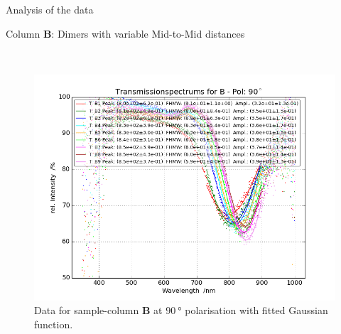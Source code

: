 \documentclass[pdftex, a4paper,11pt, twoside, UKenglish]{report}
\begin{document}
\begin{chapter}{Analysis of the data}
\begin{section}{Column \textbf{B}: Dimers with variable Mid-to-Mid
        distances}
\begin{figure}[ht!]
\begin{minipage}{.95\textwidth}
          \label{fig:TransspecFIT_BPol0}
        \end{minipage}\\
        \begin{minipage}{.95\textwidth}
          \centering
          \includegraphics[width=\textwidth]
              {Figures/TransspecFIT_BPol90.png}
          \caption{Data for sample-column \textbf{B} at $\SI{90}{\degree}$
              polarisation with fitted Gaussian function.}
          \label{fig:TransspecFIT_BPol90}
        \end{minipage}
      \end{figure}
      
    \end{section}
    
    
    

\end{chapter}
\end{document}
